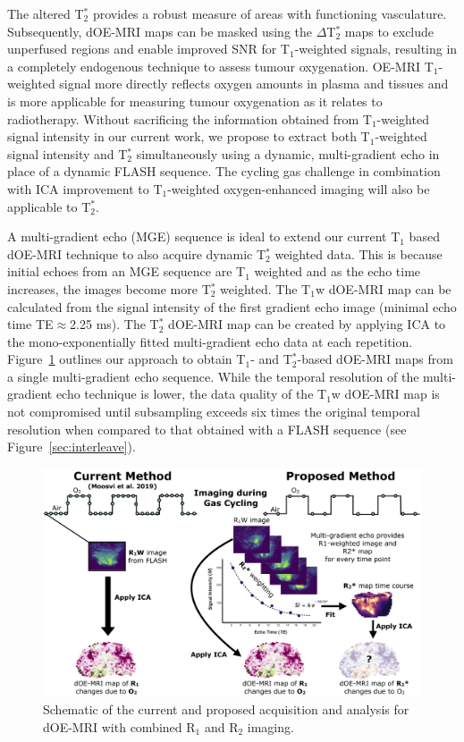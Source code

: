 The altered T$_2^*$ provides a robust measure of areas with functioning vasculature. 
Subsequently, \acs{dOE-MRI} maps can be masked using the $\Delta$T$_2^*$ maps to exclude unperfused regions and enable improved \acs{SNR} for T$_1$-weighted signals, resulting in a completely endogenous technique to assess tumour oxygenation. 
OE-MRI T$_1$-weighted signal more directly reflects oxygen amounts in plasma and tissues and is more applicable for measuring tumour oxygenation as it relates to radiotherapy.
Without sacrificing the information obtained from T$_1$-weighted signal intensity in our current work, we propose to extract both T$_1$-weighted signal intensity and T$_2^*$ simultaneously using a dynamic, multi-gradient echo in place of a dynamic FLASH sequence. 
The cycling gas challenge in combination with \acs{ICA} improvement to T$_1$-weighted oxygen-enhanced imaging will also be applicable to T$_2^*$.

A multi-gradient echo (\acs{MGE}) sequence is ideal to extend our current T$_1$ based dOE-MRI technique to also acquire dynamic T$_2^*$ weighted data.
This is because initial echoes from an \acs{MGE} sequence are T$_1$ weighted and as the echo time increases, the images become more T$_2^*$ weighted. 
The T$_1$w \acs{dOE-MRI} map can be calculated from the signal intensity of the first gradient echo image (minimal echo time TE$\approx$2.25 ms). 
The T$_2^*$ \acs{dOE-MRI} map can be created by applying \acs{ICA} to the mono-exponentially fitted multi-gradient echo data at each repetition. 
Figure~\ref{MGE_schematic} outlines our approach to obtain T$_1$- and T$_2^*$-based \acs{dOE-MRI} maps from a single multi-gradient echo sequence. 
While the temporal resolution of the multi-gradient echo technique is lower, the data quality of the T$_1$w \acs{dOE-MRI} map is not compromised until subsampling exceeds six times the original temporal resolution when compared to that obtained with a \acs{FLASH} sequence (see Figure~\ref{sec:interleave}).

\begin{figure}[htbp]
   \centering
   \includegraphics[width=\textwidth]{futurework/futurework-images/grantfig4_MGE_schematic.png} %
   \caption{Schematic of the current and proposed acquisition and analysis for \acs{dOE-MRI} with combined R$_1$ and R$_2$ imaging.
   \label{MGE_schematic}}
\end{figure}

